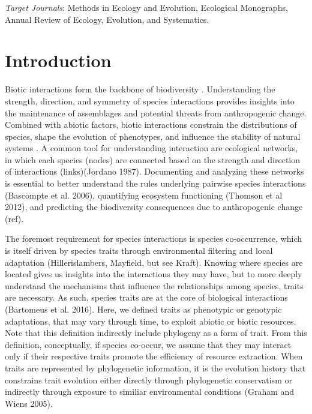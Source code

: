 \emph{Target Journals}: Methods in Ecology and Evolution, Ecological Monographs,
Annual Review of Ecology, Evolution, and Systematics.

\section{Introduction}\label{introduction}

Biotic interactions form the backbone of biodiversity
\cite{bascompte_plant-animal_2007}. Understanding the strength, direction, and
symmetry of species interactions provides insights into the maintenance of
assemblages and potential threats from anthropogenic change. Combined with
abiotic factors, biotic interactions constrain the distributions of species,
shape the evolution of phenotypes, and influence the stability of natural
systems \cite{schleuning_predicting_2015}. A common tool for understanding
interaction are ecological networks, in which each species (nodes) are connected
based on the strength and direction of interactions (links)(Jordano 1987).
Documenting and analyzing these networks is essential to better understand the
rules underlying pairwise species interactions (Bascompte et al. 2006),
quantifying ecosystem functioning (Thomson et al 2012), and predicting the
biodiversity consequences due to anthropogenic change (ref).

The foremost requirement for species interactions is species co-occurrence,
which is itself driven by species traits through environmental filtering and
local adaptation (Hillerislambers, Mayfield, but see Kraft). Knowing where
species are located gives us insights into the interactions they may have, but
to more deeply understand the mechanisms that influence the relationships among
species, traits are necessary. As such, species traits are at the core of
biological interactions (Bartomeus et al. 2016). Here, we defined traits as
phenotypic or genotypic adaptations, that may vary through time, to exploit
abiotic or biotic resources. Note that this definition indirectly include
phylogeny as a form of trait. From this definition, conceptually, if species
co-occur, we assume that they may interact only if their respective traits
promote the efficiency of resource extraction. When traits are represented by
phylogenetic information, it is the evolution history that constrains trait
evolution either directly through phylogenetic conservatism or indirectly
through exposure to similiar environmental conditions (Graham and Wiens 2005).

